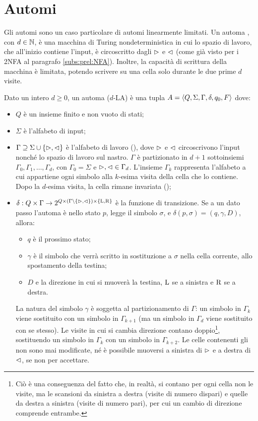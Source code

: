 \section{Automi }
Gli automi  sono un caso particolare di automi linearmente limitati. Un automa , con $d\in\mathbb N$, è una macchina di Turing nondeterministica in cui lo spazio di lavoro, che all'inizio contiene l'input, è circoscritto dagli  $\rhd$ e $\lhd$ (come già visto per i 2NFA al paragrafo \ref{subs:prel:NFA}). Inoltre, la capacità di scrittura della macchina è limitata, potendo scrivere su una cella solo durante le due prime $d$ visite.
\begin{defin}
	Dato un intero $d\geq 0$, un automa  ($d$-LA) è una tupla $A=\langle Q,\Sigma,\Gamma,\delta,q_0,F \rangle$ dove:
	\begin{itemize}
		\item $Q$ è un insieme finito e non vuoto di stati;
		\item $\Sigma$ è l'alfabeto di input;
		\item $\Gamma\supseteq\Sigma\cup\left\{ \rhd,\lhd \right\}$ è l'alfabeto di lavoro (), dove $\rhd$ e $\lhd$ circoscrivono l'input nonché lo spazio di lavoro sul nastro. $\Gamma$ è partizionato in $d+1$ sottoinsiemi $\Gamma_0,\Gamma_1,\dots,\Gamma_d$, con $\Gamma_0=\Sigma$ e $\rhd,\lhd\in\Gamma_d$. L'insieme $\Gamma_k$ rappresenta l'alfabeto a cui appartiene ogni simbolo alla $k$-esima visita della cella che lo contiene. Dopo la $d$-esima visita, la cella rimane invariata ();
		\item $\delta:Q\times\Gamma\to 2^{Q\times(\Gamma\setminus\left\{ \rhd,\lhd \right\})\times\left\{ \mathrm L,\mathrm R \right\}}$ è la funzione di transizione. Se a un dato passo l'automa è nello stato $p$, legge il simbolo $\sigma$, e $\delta(p,\sigma)=(q,\gamma,D)$, allora:
		      \begin{itemize}
			      \item $q$ è il prossimo stato;
			      \item $\gamma$ è il simbolo che verrà scritto in sostituzione a $\sigma$ nella cella corrente, allo spostamento della testina;
			      \item $D$ e la direzione in cui si muoverà la testina, $\mathrm L$ se a sinistra e $\mathrm R$ se a destra.
		      \end{itemize}
		      La natura del simbolo $\gamma$ è soggetta al partizionamento di $\Gamma$: un simbolo in $\Gamma_k$ viene sostituito con un simbolo in $\Gamma_{k+1}$ (ma un simbolo in $\Gamma_d$ viene sostituito con se stesso). Le visite in cui si cambia direzione contano doppio\footnote{Ciò è una conseguenza del fatto che, in realtà, si contano per ogni cella non le visite, ma le scansioni da sinistra a destra (visite di numero dispari) e quelle da destra a sinistra (visite di numero pari), per cui un cambio di direzione comprende entrambe.}, sostituendo un simbolo in $\Gamma_k$ con un simbolo in $\Gamma_{k+2}$. Le celle contenenti gli  non sono mai modificate, né è possibile muoversi a sinistra di $\rhd$ e a destra di $\lhd$, se non per accettare.

\end{itemize}
\end{defin}
